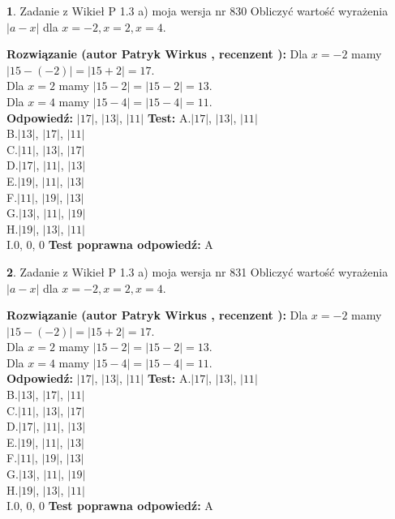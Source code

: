 \documentclass[12pt, a4paper]{article}
\theoremstyle{definition} %
\newtheorem{zad}{}
\newcommand{\zadStart}[1]{\begin{zad}#1\newline}
\newcommand{\zadStop}{\end{zad}}
\newcommand{\rozwStart}[2]{\noindent \textbf{Rozwiązanie (autor #1 , recenzent #2): }\newline}
\newcommand{\rozwStop}{\newline}
\newcommand{\odpStart}{\noindent \textbf{Odpowiedź:}\newline}
\newcommand{\odpStop}{\newline}
\newcommand{\testStart}{\noindent \textbf{Test:}\newline}
\newcommand{\testStop}{\newline}
\newcommand{\kluczStart}{\noindent \textbf{Test poprawna odpowiedź:}\newline}
\newcommand{\kluczStop}{\newline}
\begin{document}
\zadStart{Zadanie z Wikieł P 1.3 a) moja wersja nr 830}
Obliczyć wartość wyrażenia $|a - x|$ dla $x=-2,x=2,x=4$.
\zadStop
\rozwStart{Patryk Wirkus}{}
Dla $x = -2$ mamy $|15 - (-2)| = |15 + 2| = 17$.\\
Dla $x = 2$ mamy $|15 - 2| = |15 - 2| = 13$.\\
Dla $x = 4$ mamy $|15 - 4| = |15 - 4| = 11$.\\
\rozwStop
\odpStart
$|17|$, $|13|$, $|11|$
\odpStop
\testStart
A.$|17|$, $|13|$, $|11|$\\
B.$|13|$, $|17|$, $|11|$\\
C.$|11|$, $|13|$, $|17|$\\
D.$|17|$, $|11|$, $|13|$\\
E.$|19|$, $|11|$, $|13|$\\
F.$|11|$, $|19|$, $|13|$\\
G.$|13|$, $|11|$, $|19|$\\
H.$|19|$, $|13|$, $|11|$\\
I.$0$, $0$, $0$
\testStop
\kluczStart
A
\kluczStop



\zadStart{Zadanie z Wikieł P 1.3 a) moja wersja nr 831}
Obliczyć wartość wyrażenia $|a - x|$ dla $x=-2,x=2,x=4$.
\zadStop
\rozwStart{Patryk Wirkus}{}
Dla $x = -2$ mamy $|15 - (-2)| = |15 + 2| = 17$.\\
Dla $x = 2$ mamy $|15 - 2| = |15 - 2| = 13$.\\
Dla $x = 4$ mamy $|15 - 4| = |15 - 4| = 11$.\\
\rozwStop
\odpStart
$|17|$, $|13|$, $|11|$
\odpStop
\testStart
A.$|17|$, $|13|$, $|11|$\\
B.$|13|$, $|17|$, $|11|$\\
C.$|11|$, $|13|$, $|17|$\\
D.$|17|$, $|11|$, $|13|$\\
E.$|19|$, $|11|$, $|13|$\\
F.$|11|$, $|19|$, $|13|$\\
G.$|13|$, $|11|$, $|19|$\\
H.$|19|$, $|13|$, $|11|$\\
I.$0$, $0$, $0$
\testStop
\kluczStart
A
\kluczStop
\end{document}
